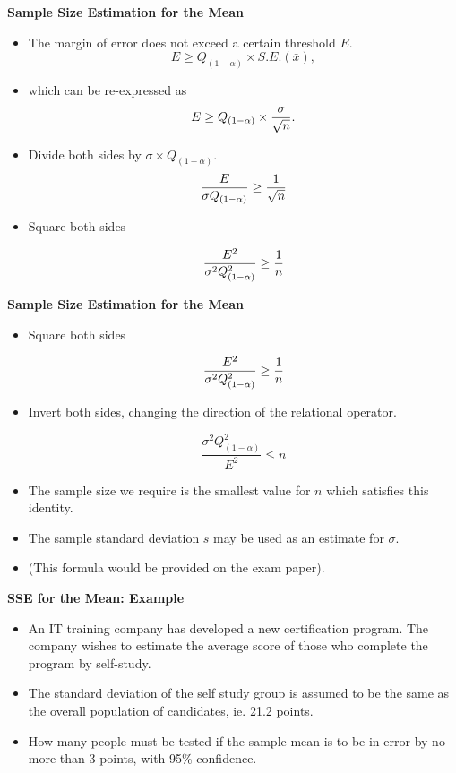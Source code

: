\documentclass[]{report}
\begin{document}

\textbf{Sample Size Estimation for the Mean}

\begin{itemize}

\item  The margin of error does not exceed a certain threshold $E$.
\[ E \geq Q_{(1-\alpha)} \times S.E.(\bar{x}), \]

\item  which can be re-expressed as
\[E \geq Q_{(1-\alpha)} \times {\sigma \over \sqrt{n} }.\]

\item  Divide both sides by $\sigma \times Q_{(1-\alpha)}$.
\[ \frac{E}{\sigma Q_{(1-\alpha)}} \geq {1 \over \sqrt{n} } \]

\item  Square both sides

\[ \frac{E^2}{\sigma^2 Q_{(1-\alpha)}^2} \geq {1 \over n } \]


\end{itemize}


\textbf{Sample Size Estimation for the Mean}

\begin{itemize}
\item  Square both sides

\[ \frac{E^2}{\sigma^2 Q^2_{(1-\alpha)}} \geq {1 \over n } \]

\item  Invert both sides, changing the direction of the relational operator.

\[ \frac{\sigma^2 Q^2_{(1-\alpha)}}{E^2} \leq n \]


\item  The sample size we require is the smallest value for $n$ which satisfies this identity.
\item  The sample standard deviation $s$ may be used as an estimate for $\sigma$.
\item  (This formula would be provided on the exam paper).
\end{itemize}





\textbf{SSE for the Mean: Example}

\begin{itemize}
\item  An IT training company has developed a new certification program. The company wishes to estimate the average score of those who complete the program by self-study.  \item  The standard deviation of the self study group is assumed to be the same as the overall population of candidates, ie. 21.2 points.
\item  How many people must be tested if the sample mean is to be in error by no more than 3 points, with 95\% confidence.
\end{itemize}
\end{document}
